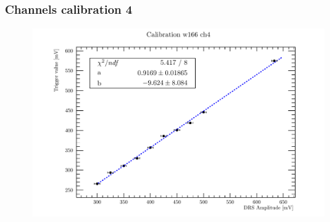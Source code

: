 
\begin{frame} [fragile]
\small
	\frametitle{Channels calibration 4}
    		\begin{figure}
		 \centering
			\includegraphics[scale=0.5]{figures/ch4.pdf}
		\end{figure}  
\end{frame}